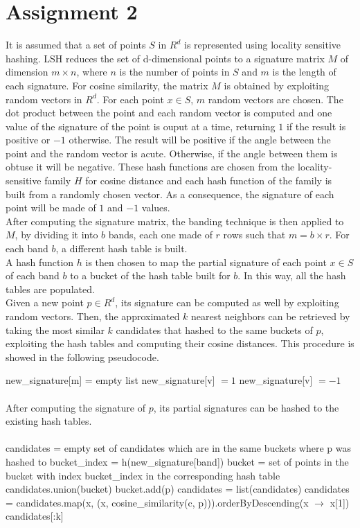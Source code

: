 \documentclass[]{report}
\begin{document}
\section*{Assignment 2}
It is assumed that a set of points $S$ in $R^d$ is represented using locality sensitive hashing. LSH reduces the set of d-dimensional points to a signature matrix $M$ of dimension $m \times n$, where $n$ is the number of points in $S$ and $m$ is the length of each signature. For cosine similarity, the matrix $M$ is obtained by exploiting random vectors in $R^d$. For each point $x \in S$, $m$ random vectors are chosen. The dot product between the point and each random vector is computed and one value of the signature of the point is ouput at a time, returning $1$ if the result is positive or $-1$ otherwise. The result will be positive if the angle between the point and the random vector is acute. Otherwise, if the angle between them is obtuse it will be negative. These hash functions are chosen from the locality-sensitive family $H$ for cosine distance and each hash function of the family is built from a randomly chosen vector. As a consequence, the signature of each point will be made of $1$ and $-1$ values. \\ After computing the signature matrix, the banding technique is then applied to $M$, by dividing it into $b$ bands, each one made of $r$ rows such that $m = b \times r$. For each band $b$, a different hash table is built. \\
A hash function $h$ is then chosen to map the partial signature of each point $x \in S$ of each band $b$ to a bucket of the hash table built for $b$. In this way, all the hash tables are populated.\\
Given a new point $p \in R^d$, its signature can be computed as well by exploiting random vectors. Then, the approximated $k$ nearest neighbors can be retrieved by taking the most similar $k$ candidates that hashed to the same buckets of $p$, exploiting the hash tables and computing their cosine distances. This procedure is showed in the following pseudocode. \\
\begin{algorithmic}
\State new\_signature[m] = empty list
 
\State new\_signature[v] $= 1$ 
\Else
\State new\_signature[v] $= -1$ 
\EndIf \EndFor \\\\
After computing the signature of $p$, its partial signatures can be hashed to the existing hash tables.\\\\
\State candidates = empty set of candidates which are in the same buckets where p was hashed to
\State bucket\_index = h(new\_signature[band])
\State bucket = set of points in the bucket with index bucket\_index in the corresponding hash table
\State candidates.union(bucket) 
\State bucket.add(p) \EndFor
\State candidates = list(candidates)
\State candidates = candidates.map(x, (x, cosine\_similarity(c, p))).orderByDescending(x $\to$ x[1]) \\
\Return candidates[\space:k]\\
\end{algorithmic}
\end{document}
